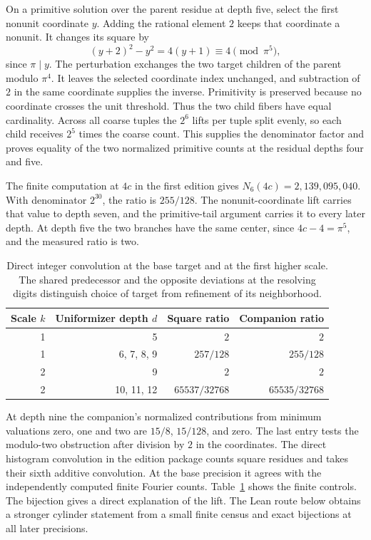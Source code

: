 \documentclass[12pt,letterpaper]{article}
\begin{document}
On a primitive solution over the parent residue at depth five, select the first nonunit coordinate $y$. Adding the rational element $2$ keeps that coordinate a nonunit. It changes its square by
\[
 (y+2)^2-y^2=4(y+1)\equiv 4\pmod{\pi^5},
\]
since $\pi\mid y$. The perturbation exchanges the two target children of the parent modulo $\pi^4$. It leaves the selected coordinate index unchanged, and subtraction of $2$ in the same coordinate supplies the inverse. Primitivity is preserved because no coordinate crosses the unit threshold. Thus the two child fibers have equal cardinality. Across all coarse tuples the $2^6$ lifts per tuple split evenly, so each child receives $2^5$ times the coarse count. This supplies the denominator factor and proves equality of the two normalized primitive counts at the residual depths four and five.

The finite computation at $4c$ in the first edition gives $N_6(4c)=2{,}139{,}095{,}040$. With denominator $2^{30}$, the ratio is $255/128$. The nonunit-coordinate lift carries that value to depth seven, and the primitive-tail argument carries it to every later depth. At depth five the two branches have the same center, since $4c-4=\pi^5$, and the measured ratio is two.

\begin{table}[htbp]
\centering
\begin{tabular}{@{}r r r r@{}}
\toprule
Scale $k$ & Uniformizer depth $d$ & Square ratio & Companion ratio \\
\midrule
1 & 5 & $2$ & $2$ \\
1 & 6, 7, 8, 9 & $257/128$ & $255/128$ \\
2 & 9 & $2$ & $2$ \\
2 & 10, 11, 12 & $65537/32768$ & $65535/32768$ \\
\bottomrule
\end{tabular}
\caption{Direct integer convolution at the base target and at the first higher scale. The shared predecessor and the opposite deviations at the resolving digits distinguish choice of target from refinement of its neighborhood.}
\label{tab:companion-controls}
\end{table}

At depth nine the companion's normalized contributions from minimum valuations zero, one and two are $15/8$, $15/128$, and zero. The last entry tests the modulo-two obstruction after division by $2$ in the coordinates. The direct histogram convolution in the edition package counts square residues and takes their sixth additive convolution. At the base precision it agrees with the independently computed finite Fourier counts. Table~\ref{tab:companion-controls} shows the finite controls. The bijection gives a direct explanation of the lift. The Lean route below obtains a stronger cylinder statement from a small finite census and exact bijections at all later precisions.
\end{document}

